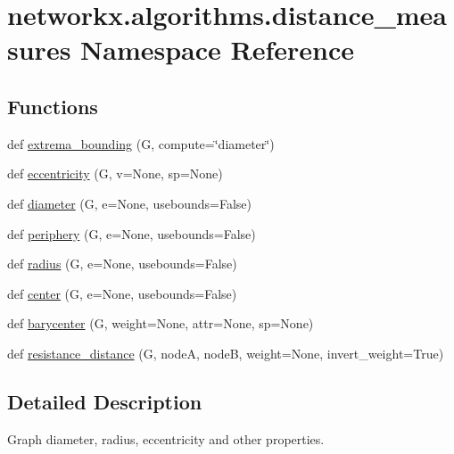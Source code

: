 \hypertarget{namespacenetworkx_1_1algorithms_1_1distance__measures}{}\section{networkx.\+algorithms.\+distance\+\_\+measures Namespace Reference}
\label{namespacenetworkx_1_1algorithms_1_1distance__measures}
\subsection*{Functions}
\begin{DoxyCompactItemize}
\item 
def \hyperlink{namespacenetworkx_1_1algorithms_1_1distance__measures_ad6f5c3c2bbcbb92abf774214b84ddc31}{extrema\+\_\+bounding} (G, compute=\char`\"{}diameter\char`\"{})
\item 
def \hyperlink{namespacenetworkx_1_1algorithms_1_1distance__measures_aa09822182da9f014bc660e3bfe00f8a7}{eccentricity} (G, v=None, sp=None)
\item 
def \hyperlink{namespacenetworkx_1_1algorithms_1_1distance__measures_a1fbf5089b3e4894da24660e947bdbcfb}{diameter} (G, e=None, usebounds=False)
\item 
def \hyperlink{namespacenetworkx_1_1algorithms_1_1distance__measures_a83a03687f3376c56cb956839a6e020df}{periphery} (G, e=None, usebounds=False)
\item 
def \hyperlink{namespacenetworkx_1_1algorithms_1_1distance__measures_a2bcc1cd0cceac3e3440218a488d28773}{radius} (G, e=None, usebounds=False)
\item 
def \hyperlink{namespacenetworkx_1_1algorithms_1_1distance__measures_a03f5865f14e2dc2b14e15dfc0f9a8d66}{center} (G, e=None, usebounds=False)
\item 
def \hyperlink{namespacenetworkx_1_1algorithms_1_1distance__measures_a6460ec432e7ad6676432e56e7c1e4dca}{barycenter} (G, weight=None, attr=None, sp=None)
\item 
def \hyperlink{namespacenetworkx_1_1algorithms_1_1distance__measures_a70a703783d4b11fc37ebf082199cb321}{resistance\+\_\+distance} (G, nodeA, nodeB, weight=None, invert\+\_\+weight=True)
\end{DoxyCompactItemize}


\subsection{Detailed Description}
\begin{DoxyVerb}Graph diameter, radius, eccentricity and other properties.\end{DoxyVerb}
 

